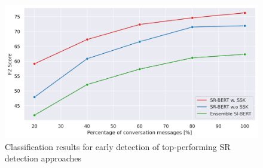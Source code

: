 \documentclass[letterpaper]{article} %
\begin{document}
\label{ExplicitLex} 
\begin{figure}[]
\centering
\includegraphics[width=1.04\columnwidth]{figures/normal_F2.png} 
\caption{Classification results for early detection of top-performing SR detection approaches}
\label{fig:Early detection}
\end{figure}
\end{document}
